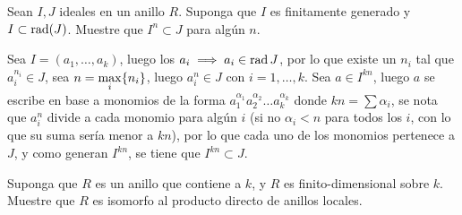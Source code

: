 \begin{prob}{2.41}
    Sean \(I,J\) ideales en un anillo \(R\). Suponga que \(I\) es finitamente generado y \(I\subset\operatorname{rad}(J)\). Muestre que \(I^n\subset J\) para algún \(n\).
\end{prob}

\begin{sol}{2.41}
    Sea \(I=(a_1,\dots, a_k)\), luego los \(a_i\implies a_i\in\operatorname{rad} J\), por lo que existe un \(n_i\) tal que \(a_i^{n_i}\in J\), sea \(\displaystyle n=\max_i\{n_i\}\), luego \(a_i^n\in J\) con \(i=1,\dots, k\). Sea \(a
    \in I^{kn}\), luego \(a\) se escribe en base a monomios de la forma \(a_1^{\alpha_1}a_2^{\alpha_2}\dots a_k^{\alpha_k}\) donde \(kn=\sum\alpha_i\), se nota que \(a_i^n\) divide a cada monomio para algún \(i\) (si no \(\alpha_i<n\) para todos los \(i\), con lo que su suma sería menor a \(kn\)), por lo que cada uno de los monomios pertenece a \(J\), y como generan \(I^{kn}\), se tiene que \(I^{kn}\subset J\).
\end{sol}

\begin{prob}{2.47}
    Suponga que \(R\) es un anillo que contiene a \(k\), y \(R\) es finito-dimensional sobre \(k\). Muestre que \(R\) es isomorfo al producto directo de anillos locales.
\end{prob}

\begin{sol}{2.47}
    
\end{sol}

